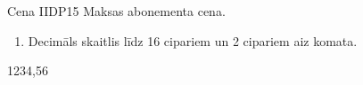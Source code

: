 {Cena}
{IIDP15}
{
	Maksas abonementa cena.
}
{
	\begin{enumerate}
		\item Decimāls skaitlis līdz 16 cipariem un 2 cipariem aiz komata.
	\end{enumerate}
}
{
	1234,56
}
